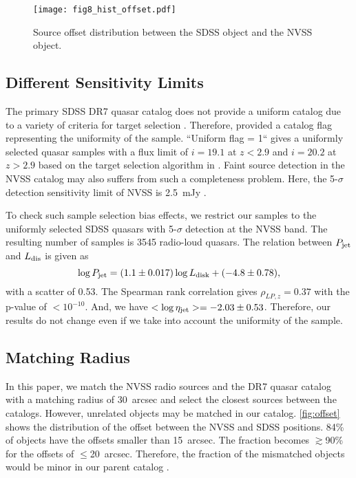 \documentclass[preprint2,twocolappendix]{aastex6}
\begin{document}
\begin{figure}[t]
 \begin{center}
  \texttt{[image: fig8\_hist\_offset.pdf]} 
 \end{center}
\caption{Source offset distribution between the SDSS object and the NVSS object.}\label{fig:offset}
\end{figure}

\subsection{Different Sensitivity Limits}
The primary SDSS DR7 quasar catalog does not provide a uniform catalog due to a variety of criteria for target selection \citep{she11}.  Therefore, \citet{she11} provided a catalog flag representing the uniformity of the sample. ``Uniform flag = 1`` gives a uniformly selected quasar samples with a flux limit of $i=19.1$ at $z<2.9$ and $i=20.2$ at $z>2.9$ based on the target selection algorithm in \citet{ric02}. Faint source detection in the NVSS catalog may also suffers from such a completeness problem. Here, the 5-$\sigma$ detection sensitivity limit of NVSS is 2.5~mJy \citep[e.g.][]{con98,kim08}. 

To check such sample selection bias effects, we restrict our samples to the uniformly selected SDSS quasars with 5-$\sigma$ detection at the NVSS band. The resulting number of samples is 3545 radio-loud quasars. The relation between $P_{\rm jet}$ and $L_{\rm dis}$ is given as
\begin{equation}
\log P_{\rm jet} = (1.1\pm0.017)\log L_{\rm disk} + (-4.8 \pm 0.78),
\end{equation}
with a scatter of 0.53. The Spearman rank correlation gives $\rho_{LP,z}=0.37$ with the p-value of $<10^{-10}$. And, we have $<\log \eta_{\rm jet}>=-2.03\pm0.53$. Therefore, our results do not change even if we take into account the uniformity of the sample.


\subsection{Matching Radius}
\label{subsec:offset}
In this paper, we match the NVSS radio sources and the DR7 quasar catalog with a matching radius of 30~arcsec and select the closest sources between the catalogs. However, unrelated objects may be matched in our catalog. \autoref{fig:offset} shows the distribution of the offset between the NVSS and SDSS positions. 84\% of objects have the offsets smaller than 15~arcsec. The fraction becomes $\gtrsim$90\% for the offsets of $\le$20~arcsec. Therefore, the fraction of the mismatched objects would be minor in our parent catalog \citep{bes05}.
\end{document}
